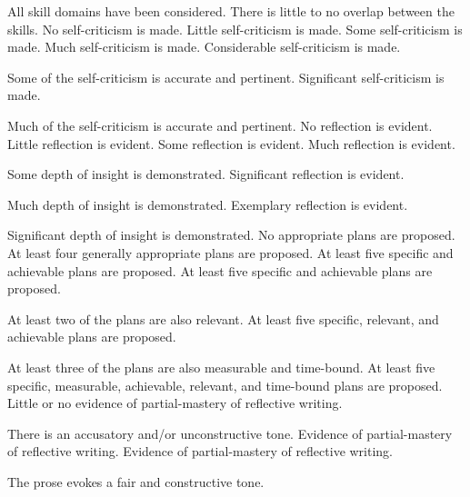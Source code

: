 \documentclass{../../fal_assignment}
\begin{document}
\begin{markingrubric}
        \par 		All skill domains have been considered. There is little to no overlap between the skills.
%
        \grade\fail 	No self-criticism is made.
        \grade 		Little self-criticism is made.
        \grade 		Some self-criticism is made.
        \grade 		Much self-criticism is made.
        \grade 		Considerable self-criticism is made.
            \par 		Some of the self-criticism is accurate and pertinent.
        \grade 		Significant self-criticism is made.
            \par 		Much of the self-criticism is accurate and pertinent.
%
        \grade\fail 	No reflection is evident.
        \grade 		Little reflection is evident.
        \grade 		Some reflection is evident.
        \grade 		Much reflection is evident.
        \par 		Some depth of insight is demonstrated.
        \grade 		Significant reflection is evident.
        \par 		Much depth of insight is demonstrated.
        \grade 		Exemplary reflection is evident.
        \par 		Significant depth of insight is demonstrated.
%
        \grade\fail 	No appropriate plans are proposed.
        \grade 		At least four generally appropriate plans are proposed.
        \grade 		At least five specific and achievable plans are proposed. 
        \grade 		At least five specific and achievable plans are proposed. 
        \par 		At least two of the plans are also relevant.
        \grade 		At least five specific, relevant, and achievable plans are proposed. 
        \par 		At least three of the plans are also measurable and time-bound.
        \grade 		At least five specific, measurable, achievable, relevant, and time-bound plans are proposed. 
%
        \grade\fail 	Little or no evidence of partial-mastery of reflective writing.
         \par 		There is an accusatory and/or unconstructive tone.
        \grade 		Evidence of partial-mastery of reflective writing.
        \grade 		Evidence of partial-mastery of reflective writing.
         \par 		The prose evokes a fair and constructive tone.

\end{markingrubric}
\end{document}
